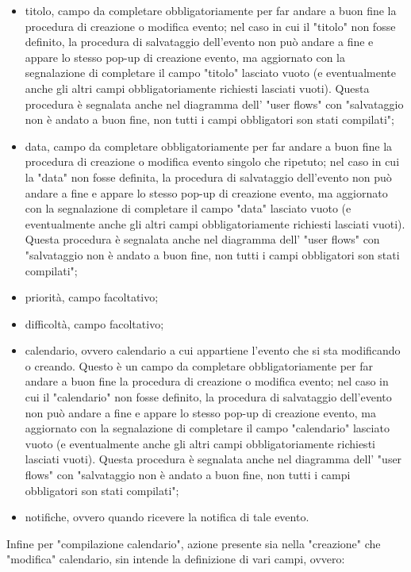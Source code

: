 \begin{itemize}
    \item titolo, campo da completare obbligatoriamente per far andare a buon fine la procedura di creazione o modifica evento; nel caso in cui il "titolo" non fosse definito, la procedura di salvataggio dell'evento non può andare a fine e appare lo stesso pop-up di creazione evento, ma aggiornato con la segnalazione di completare il campo "titolo" lasciato vuoto (e eventualmente anche gli altri campi obbligatoriamente richiesti lasciati vuoti). Questa procedura è segnalata anche nel diagramma dell' "user flows" con "salvataggio non è andato a buon fine, non tutti i campi obbligatori son stati compilati";
    \item data, campo da completare obbligatoriamente per far andare a buon fine la procedura di creazione o modifica evento singolo che ripetuto; nel caso in cui la "data" non fosse definita, la procedura di salvataggio dell'evento non può andare a fine e appare lo stesso pop-up di creazione evento, ma aggiornato con la segnalazione di completare il campo "data" lasciato vuoto (e eventualmente anche gli altri campi obbligatoriamente richiesti lasciati vuoti). Questa procedura è segnalata anche nel diagramma dell' "user flows" con "salvataggio non è andato a buon fine, non tutti i campi obbligatori son stati compilati";
    \item priorità, campo facoltativo;
    \item difficoltà, campo facoltativo;
    \item calendario, ovvero calendario a cui appartiene l'evento che si sta modificando o creando. Questo è un campo da completare obbligatoriamente per far andare a buon fine la procedura di creazione o modifica evento; nel caso in cui il "calendario" non fosse definito, la procedura di salvataggio dell'evento non può andare a fine e appare lo stesso pop-up di creazione evento, ma aggiornato con la segnalazione di completare il campo "calendario" lasciato vuoto (e eventualmente anche gli altri campi obbligatoriamente richiesti lasciati vuoti). Questa procedura è segnalata anche nel diagramma dell' "user flows" con "salvataggio non è andato a buon fine, non tutti i campi obbligatori son stati compilati";
    \item notifiche, ovvero quando ricevere la notifica di tale evento.
\end{itemize}
Infine per "compilazione calendario", azione presente sia nella "creazione" che "modifica" calendario, sin intende la definizione di vari campi, ovvero:
